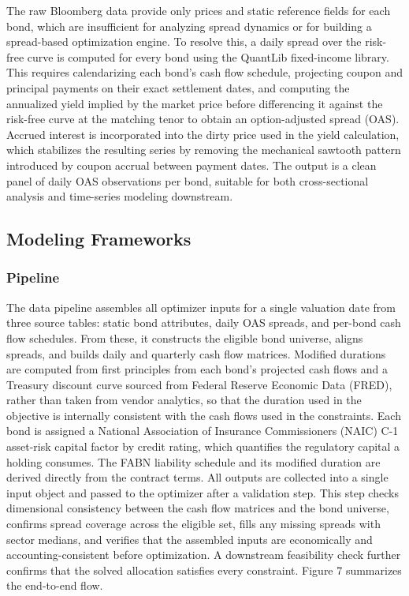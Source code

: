 \documentclass[12pt]{article}
\begin{document}
The raw Bloomberg data provide only prices and static reference fields for each bond, which are insufficient for analyzing spread dynamics or for building a spread-based optimization engine. To resolve this, a daily spread over the risk-free curve is computed for every bond using the QuantLib fixed-income library. This requires calendarizing each bond's cash flow schedule, projecting coupon and principal payments on their exact settlement dates, and computing the annualized yield implied by the market price before differencing it against the risk-free curve at the matching tenor to obtain an option-adjusted spread (OAS). Accrued interest is incorporated into the dirty price used in the yield calculation, which stabilizes the resulting series by removing the mechanical sawtooth pattern introduced by coupon accrual between payment dates. The output is a clean panel of daily OAS observations per bond, suitable for both cross-sectional analysis and time-series modeling downstream.

\subsection{Modeling Frameworks}

\subsubsection{Pipeline}

The data pipeline assembles all optimizer inputs for a single valuation date from three source tables: static bond attributes, daily OAS spreads, and per-bond cash flow schedules. From these, it constructs the eligible bond universe, aligns spreads, and builds daily and quarterly cash flow matrices. Modified durations are computed from first principles from each bond's projected cash flows and a Treasury discount curve sourced from Federal Reserve Economic Data (FRED), rather than taken from vendor analytics, so that the duration used in the objective is internally consistent with the cash flows used in the constraints. Each bond is assigned a National Association of Insurance Commissioners (NAIC) C-1 asset-risk capital factor by credit rating, which quantifies the regulatory capital a holding consumes. The FABN liability schedule and its modified duration are derived directly from the contract terms. All outputs are collected into a single input object and passed to the optimizer after a validation step. This step checks dimensional consistency between the cash flow matrices and the bond universe, confirms spread coverage across the eligible set, fills any missing spreads with sector medians, and verifies that the assembled inputs are economically and accounting-consistent before optimization. A downstream feasibility check further confirms that the solved allocation satisfies every constraint. Figure 7 summarizes the end-to-end flow.
\end{document}
